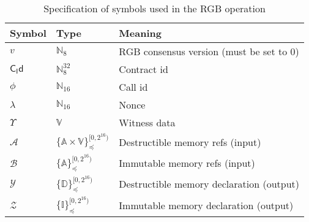 \documentclass[9pt,oneside]{amsart}
\begin{document}
\begin{table}[h]
\centering
\caption{Specification of symbols used in the RGB operation}\label{tab:op}
\begin{tabular}{ l l l }
\toprule
Symbol & Type & Meaning \\
\midrule
$v$ & $\mathbb{N}_8$ & RGB consensus version (must be set to $0$) \\
$\mathsf{C_Id}$ & $\mathbb{N}_8^{32}$ & Contract id \\
$\phi$ & $\mathbb{N}_{16}$ & Call id \\
$\lambda$ & $\mathbb{N}_{16}$ & Nonce \\
$\Upsilon$ & $\mathbb{V}$ & Witness data \\
$\mathcal{A}$ & $\{\mathbb{A} \times \mathbb{V}\}_\preceq^{[0, 2^{16})}$ & Destructible memory refs (input) \\
$\mathcal{B}$ & $\{\mathbb{A}\}_\preceq^{[0, 2^{16})}$ & Immutable memory refs (input) \\
$\mathcal{Y}$ & $\{\mathbb{D}\}_\preceq^{[0, 2^{16})}$ & Destructible memory declaration (output) \\
$\mathcal{Z}$ & $\{\mathbb{I}\}_\preceq^{[0, 2^{16})}$ & Immutable memory declaration (output) \\
\bottomrule
\end{tabular}
\end{table}
\end{document}
